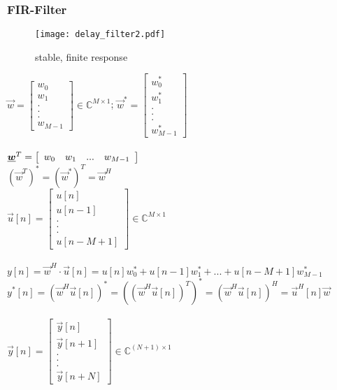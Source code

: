 \subsubsection{FIR-Filter}
\begin{figure}[H]
	\centering
	\texttt{[image: delay\_filter2.pdf]}
	\caption{stable, finite response}
	\label{delay2} 
\end{figure}

\begin{doublespace}
$\vec{w}= \left[\begin{array}{c}
w_0\\ w_1\\ .\\.\\. \\ w_{M-1}
\end{array}\right] \in \mathbb{C}^{M\times 1}$; \qquad $\vec{w}^*= \left[\begin{array}{c}
w_0^*\\ w_1^*\\ .\\.\\. \\ w_{M-1}^*
\end{array}\right]$\\ \\
$\vec{w}^T= \left[\begin{array}{c c c c}
w_0& w_1& ...&w_{M-1}
\end{array}\right]$\\
$(\vec{w}^T)^*=(\vec{w}^*)^T= \vec{w}^H$\\

$\vec{u}[n]= \left[\begin{array}{c}
u[n]\\ u[n-1]\\ .\\.\\. \\ u[n-M+1]
\end{array}\right] \in \mathbb{C}^{M\times 1}$\\ \\
$y[n]= \vec{w}^H \cdot \vec{u}[n] = u[n]w_0^*+ u[n-1]w_1^* + ... + u[n-M+1]w_{M-1}^*$\\
$y^*[n]= (\vec{w}^H\vec{u}[n])^*= (( \vec{w}^H \vec{u}[n])^T)^*= (\vec{w}^H \vec{u}[n])^H= \vec{u}^H[n]\vec{w}$\\ \\
$\vec{y}[n]= \left[\begin{array}{c}
	\vec{y}[n]\\ \vec{y}[n+1]\\ .\\.\\. \\ \vec{y}[n+N]
\end{array}\right]\in \mathbb{C}^{(N+1)\times 1}$\\ \\


\end{doublespace}
